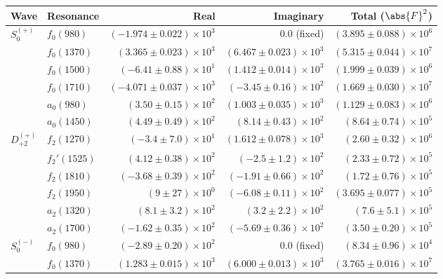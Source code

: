 \begin{table}[ht]
    \begin{center}
        \begin{tabular}{llrrr}\toprule
        Wave & Resonance & Real & Imaginary & Total ($\abs{F}^2$) \\\midrule
$S_{0}^{(+)}$ & $f_{0}(980)$ & $(-1.974 \pm 0.022) \times 10^{3}$ & $0.0$ (fixed) & $(3.895 \pm 0.088) \times 10^{6}$ \\
 & $f_{0}(1370)$ & $(3.365 \pm 0.023) \times 10^{3}$ & $(6.467 \pm 0.023) \times 10^{3}$ & $(5.315 \pm 0.044) \times 10^{7}$ \\
 & $f_{0}(1500)$ & $(-6.41 \pm 0.88) \times 10^{1}$ & $(1.412 \pm 0.014) \times 10^{3}$ & $(1.999 \pm 0.039) \times 10^{6}$ \\
 & $f_{0}(1710)$ & $(-4.071 \pm 0.037) \times 10^{3}$ & $(-3.45 \pm 0.16) \times 10^{2}$ & $(1.669 \pm 0.030) \times 10^{7}$ \\
 & $a_{0}(980)$ & $(3.50 \pm 0.15) \times 10^{2}$ & $(1.003 \pm 0.035) \times 10^{3}$ & $(1.129 \pm 0.083) \times 10^{6}$ \\
 & $a_{0}(1450)$ & $(4.49 \pm 0.49) \times 10^{2}$ & $(8.14 \pm 0.43) \times 10^{2}$ & $(8.64 \pm 0.74) \times 10^{5}$ \\
$D_{+2}^{(+)}$ & $f_{2}(1270)$ & $(-3.4 \pm 7.0) \times 10^{1}$ & $(1.612 \pm 0.078) \times 10^{3}$ & $(2.60 \pm 0.32) \times 10^{6}$ \\
 & $f_{2}'(1525)$ & $(4.12 \pm 0.38) \times 10^{2}$ & $(-2.5 \pm 1.2) \times 10^{2}$ & $(2.33 \pm 0.72) \times 10^{5}$ \\
 & $f_{2}(1810)$ & $(-3.68 \pm 0.39) \times 10^{2}$ & $(-1.91 \pm 0.66) \times 10^{2}$ & $(1.72 \pm 0.76) \times 10^{5}$ \\
 & $f_{2}(1950)$ & $(9 \pm 27) \times 10^{0}$ & $(-6.08 \pm 0.11) \times 10^{2}$ & $(3.695 \pm 0.077) \times 10^{5}$ \\
 & $a_{2}(1320)$ & $(8.1 \pm 3.2) \times 10^{2}$ & $(3.2 \pm 2.2) \times 10^{2}$ & $(7.6 \pm 5.1) \times 10^{5}$ \\
 & $a_{2}(1700)$ & $(-1.62 \pm 0.35) \times 10^{2}$ & $(-5.69 \pm 0.36) \times 10^{2}$ & $(3.50 \pm 0.20) \times 10^{5}$ \\
$S_{0}^{(-)}$ & $f_{0}(980)$ & $(-2.89 \pm 0.20) \times 10^{2}$ & $0.0$ (fixed) & $(8.34 \pm 0.96) \times 10^{4}$ \\
 & $f_{0}(1370)$ & $(1.283 \pm 0.015) \times 10^{3}$ & $(6.000 \pm 0.013) \times 10^{3}$ & $(3.765 \pm 0.016) \times 10^{7}$ \\

\end{tabular}
\end{center}
\end{table}
